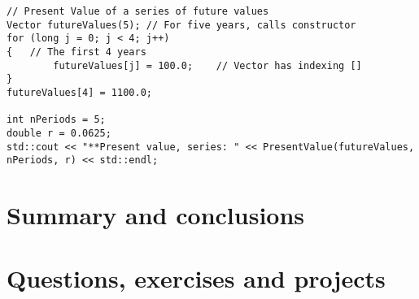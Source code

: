 \begin{lstlisting}
// Present Value of a series of future values
Vector futureValues(5);	// For five years, calls constructor
for (long j = 0; j < 4; j++)
{	// The first 4 years
		futureValues[j] = 100.0;	// Vector has indexing []
}
futureValues[4] = 1100.0;

int nPeriods = 5;
double r = 0.0625;
std::cout << "**Present value, series: " << PresentValue(futureValues, nPeriods, r) << std::endl;
\end{lstlisting}

\section{Summary and conclusions}

\section{Questions, exercises and projects}

